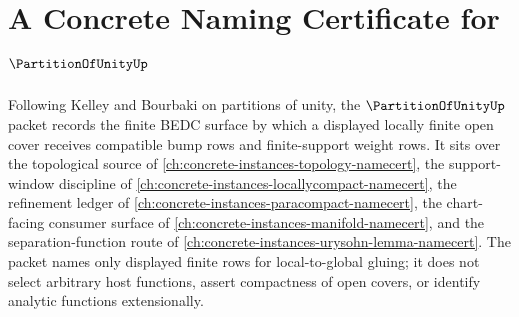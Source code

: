 \chapter{A Concrete Naming Certificate for $\PartitionOfUnityUp$}
\label{ch:concrete-instances-partition-of-unity-namecert}

Following Kelley and Bourbaki on partitions of unity, the $\PartitionOfUnityUp$ packet records the finite BEDC surface by which a displayed locally finite open cover receives compatible bump rows and finite-support weight rows. It sits over the topological source of \autoref{ch:concrete-instances-topology-namecert}, the support-window discipline of \autoref{ch:concrete-instances-locallycompact-namecert}, the refinement ledger of \autoref{ch:concrete-instances-paracompact-namecert}, the chart-facing consumer surface of \autoref{ch:concrete-instances-manifold-namecert}, and the separation-function route of \autoref{ch:concrete-instances-urysohn-lemma-namecert}. The packet names only displayed finite rows for local-to-global gluing; it does not select arbitrary host functions, assert compactness of open covers, or identify analytic functions extensionally.

